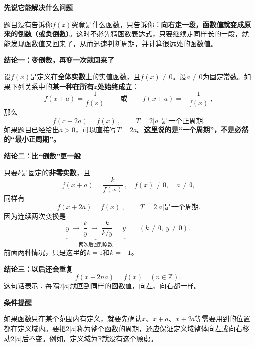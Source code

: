 \begin{statementbox}


\textbf{\textcolor{CStatement}{先说它能解决什么问题}}

题目没有告诉你$f(x)$究竟是什么函数，只告诉你：\textbf{向右走一段，函数值就变成原来的倒数（或负倒数）}。这时不必先猜函数表达式，只要继续走同样长的一段，就能发现函数值又回来了，从而迅速判断周期，并计算很远处的函数值。

\medskip
\textbf{\textcolor{CStatement}{结论一：变倒数，再变一次就回来了}}

设$f(x)$是定义在\textbf{全体实数}上的实值函数，且$f(x)\neq0$。设$a\neq0$为固定常数。如果下列关系中的\textbf{某一种在所有$x$处始终成立}：
\[
\boxed{\ f(x+a)=\frac{1}{f(x)}\ }
\qquad\text{或}\qquad
\boxed{\ f(x+a)=-\frac{1}{f(x)}\ },
\]
那么
\[
\boxed{\ f(x+2a)=f(x)\ },\qquad
\boxed{\ T=2|a|\ \text{是一个正周期}}.
\]
如果题目已经给出$a>0$，可以直接写$T=2a$。\textbf{这里说的是“一个周期”，不是必然的“最小正周期”。}

\medskip
\end{statementbox}\clearpage\begin{statementbox}\textbf{\textcolor{CStatement}{结论二：比“倒数”更一般}}

只要$k$是固定的\textbf{非零实数}，且
\[
\boxed{\ f(x+a)=\frac{k}{f(x)}\ },\quad f(x)\neq0,\quad a\neq0,
\]
同样有
\[
\boxed{\ f(x+2a)=f(x)\ },\qquad \boxed{\ T=2|a|\text{是一个周期}}.
\]
因为连续两次变换是
\[
\underbrace{y\ \longrightarrow\ \frac{k}{y}\ \longrightarrow\
\frac{k}{k/y}=y}_{\text{两次后回到原数}}\qquad (k\neq0,\ y\neq0).
\]
前面两种情况，只是这里的$k=1$和$k=-1$。

\medskip
\textbf{\textcolor{CStatement}{结论三：以后还会重复}}
\[
 f(x+2na)=f(x)\quad(n\in\mathbb Z).
\]
这句话表示：每隔$2|a|$就回到同样的函数值，向左、向右都一样。

\medskip
\textbf{\textcolor{CStatement}{条件提醒}}

如果函数只在某个范围内有定义，就要先确认$x$、$x+a$、$x+2a$等需要用到的位置都在定义域内。要把$2|a|$称为整个函数的周期，还应保证定义域整体向左或向右移动$2|a|$后不变。例如，定义域为$\mathbb R$就没有这个顾虑。
\end{statementbox}
